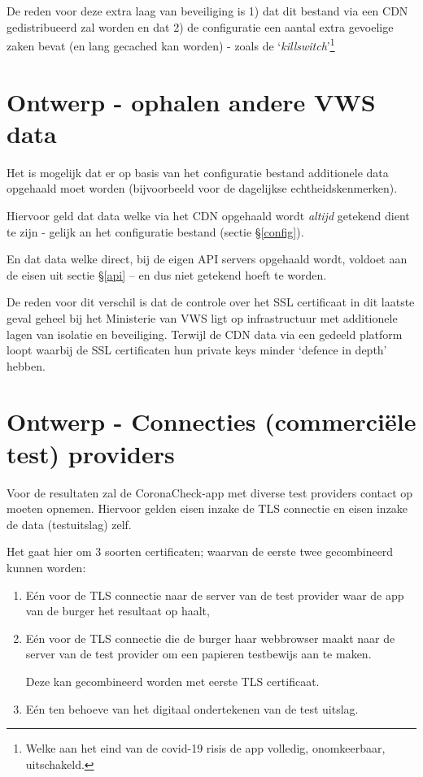 \documentclass[11.0pt]{report}
\def\CoronaCheckApp{CoronaCheck-app\xspace}
\begin{document}
De reden voor deze extra laag van beveiliging is 1) dat dit bestand via een CDN gedistribueerd zal worden en dat 2) de configuratie een aantal extra gevoelige zaken bevat (en lang gecached kan worden) - zoals de `\emph{killswitch}'\footnote{Welke aan het eind van de covid-19 risis de app volledig, onomkeerbaar, uitschakeld.}

\section{Ontwerp - ophalen andere VWS data}

Het is mogelijk dat er op basis van het configuratie bestand additionele data opgehaald moet worden (bijvoorbeeld voor de dagelijkse echtheidskenmerken).

Hiervoor geld dat data welke via het CDN opgehaald wordt \emph{altijd} getekend dient te zijn - gelijk an het configuratie bestand (sectie \S\ref{config}).

En dat data welke direct, bij de eigen API servers opgehaald wordt, voldoet aan de eisen uit sectie \S\ref{api} -- en dus niet getekend hoeft te worden.

De reden voor dit verschil is dat de controle over het SSL certificaat in dit laatste geval geheel bij het Ministerie van VWS ligt op infrastructuur met additionele lagen van isolatie en beveiliging. Terwijl de CDN data via een gedeeld platform loopt waarbij de SSL certificaten hun private keys minder `defence in depth' hebben.

\fi
\section{Ontwerp - Connecties (commerciële test) providers}

Voor de resultaten zal de \CoronaCheckApp met diverse test providers contact op moeten opnemen. Hiervoor gelden eisen inzake de TLS connectie en eisen inzake de data (testuitslag) zelf. 

Het gaat hier om 3 soorten certificaten; waarvan de eerste twee gecombineerd kunnen worden:

\begin{enumerate}
\item Eén voor de TLS connectie naar de server van de test provider waar de app van de burger het resultaat op haalt, 
\item Eén voor de TLS connectie die de burger haar webbrowser maakt naar de server van de test provider om een papieren testbewijs aan te maken.

Deze kan gecombineerd worden met eerste TLS certificaat.
\item Eén ten behoeve van het digitaal ondertekenen van de test uitslag.
\end{enumerate}
\end{document}
